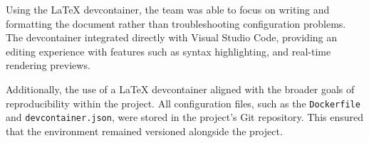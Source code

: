 \documentclass[preview]{standalone}
\begin{document}
Using the LaTeX devcontainer, the team was able to focus on writing and
formatting the document rather than troubleshooting configuration problems. The
devcontainer integrated directly with Visual Studio Code, providing an editing
experience with features such as syntax highlighting, and real-time rendering
previews.

Additionally, the use of a LaTeX devcontainer aligned with the broader goals of
reproducibility within the project. All configuration files, such as the
\texttt{Dockerfile} and \texttt{devcontainer.json}, were stored in the project's
Git repository. This ensured that the environment remained versioned alongside
the project.


\newpage{}
\end{document}
